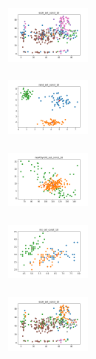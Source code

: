 \begin{figure}[H]
    \begin{subfigure}
        \centering
        \includegraphics[width=0.234\textwidth]{img/am10/ecoli_set_const_10_277451237_clust.png}
    \end{subfigure}
    \hfill
    \begin{subfigure}
        \centering
        \includegraphics[width=0.234\textwidth]{img/am10/rand_set_const_10_277451237_clust.png}
    \end{subfigure}
    \hfill
    \begin{subfigure}
        \centering
        \includegraphics[width=0.234\textwidth]{img/am10/newthyroid_set_const_10_277451237_clust.png}
    \end{subfigure}
    \hfill
    \begin{subfigure}
        \centering
        \includegraphics[width=0.234\textwidth]{img/am10/iris_set_const_10_49258669_clust.png}
    \end{subfigure}
    \hfill
    \begin{subfigure}
        \centering
        \includegraphics[width=0.234\textwidth]{img/am10/ecoli_set_const_10_49258669_clust.png}
    \end{subfigure}
    \hfill
    \begin{subfigure}
        \centering

\end{subfigure}
\end{figure}
